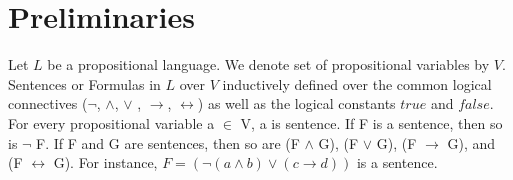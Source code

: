 \section{Preliminaries}
Let $L$ be a propositional language. We denote set of propositional variables by $V$. Sentences or Formulas in $L$ over $V$
inductively defined over the common logical connectives ($\neg$, $\land$, $\lor$ , $\rightarrow$, $\leftrightarrow$) as well as the logical constants $true$ and $false$.
For every propositional variable a $\in$ V, a is sentence. If F is a sentence, then so is $\neg$ F. If F and G are sentences, 
then so are (F $\land$ G), (F $\lor$ G), (F $\rightarrow$ G), and (F $\leftrightarrow$ G). For instance, $F = (\neg(a \land b) \lor (c \rightarrow d))$ is a sentence.